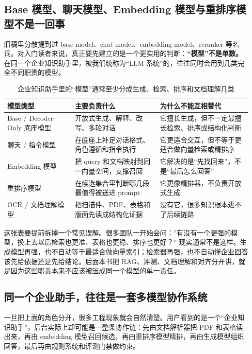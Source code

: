 \subsection{Base 模型、聊天模型、Embedding 模型与重排序模型不是一回事}
旧稿里分散提到过 base model、chat model、embedding model、reranker 等名词。对入门读者来说，真正要先建立的是一个更实用的判断：\textbf{“模型”不是单数。} 在同一个企业知识助手里，被我们统称为“LLM 系统”的，往往同时会用到几类完全不同职责的模型。

\begin{table}[H]
\centering
\small
\begin{tabularx}{\textwidth}{>{\raggedright\arraybackslash}p{2.7cm}>{\raggedright\arraybackslash}p{3cm}>{\raggedright\arraybackslash}X}
\toprule
\textbf{模型类型} & \textbf{主要负责什么} & \textbf{为什么不能互相替代} \\
\midrule
Base / Decoder-Only 底座模型 & 开放式生成、解释、改写、多轮对话 & 它擅长生成，但不一定最擅长检索、排序或结构化判断 \\
聊天 / 指令模型 & 在底座上补足对话格式、角色遵循和指令执行 & 它更适合交互，但不等于更适合做向量检索或精排序 \\
Embedding 模型 & 把 query 和文档映射到同一向量空间，支撑召回 & 它解决的是“先找回来”，不是“最后怎么回答” \\
重排序模型 & 在候选集合里判断哪几段最值得被送进 prompt & 它更像精排器，不负责开放式生成 \\
OCR / 文档理解模型 & 把扫描件、PDF、表格和版面先读成结构化证据 & 没有它，很多知识根本进不了后续链路 \\
\bottomrule
\end{tabularx}
\caption{企业知识助手里的“模型”通常至少分成生成、检索、排序和文档理解几类}
\label{tab:model-role-map}
\end{table}

这张表要提前拆掉一个常见误解。很多团队一开始会问：”有没有一个更强的模型，换上去以后检索也更准、表格也更稳、排序也更好？” 现实通常不是这样。生成模型再强，也不自动等于最适合做向量索引；检索器再强，也不自动懂企业回答该先给依据还是先给结论。后面本书把 RAG、评测、文档理解和对齐分开讲，就是因为这些职责本来不应该被压成同一个模型的单一责任。

\subsection{同一个企业助手，往往是一套多模型协作系统}
一旦把上面的角色分开，很多工程现象就会自然清楚。用户看到的是一个“企业知识助手”，后台实际上却可能是一整条协作链：先由文档解析器把 PDF 和表格读出来，再由 embedding 模型召回候选，再由重排序模型精排，再由生成模型组织回答，最后再由规则系统和评测门禁做约束。

